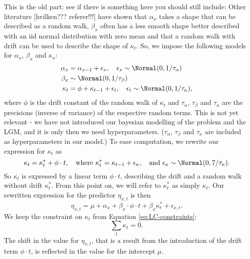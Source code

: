 \textcolor{myDarkGreen}{This is the old part: see if there is something here you should still include: }
Other literature [hvilken??? referer!!!] have shown that $\alpha_x$ takes a shape that can be described as a random walk, $\beta_x$ often has a less smooth shape better described with an iid normal distribution with zero mean and that a random walk with drift can be used to describe the shape of $\kappa_t$. So, we impose the following models for $\alpha_x$, $\beta_x$ and $\kappa_x$:
\begin{equation}
    \begin{aligned}
    \alpha_x &= \alpha_{x-1} + \epsilon_{x}, \quad \epsilon_x \sim \Normal(0,1/\tau_{\alpha}) \\
    \beta_x &\sim \Normal(0, 1/\tau_{\beta}) \\
    \kappa_t &= \phi + \kappa_{t-1} + \epsilon_t, \quad \epsilon_t\sim \Normal(0, 1/\tau_\kappa),
    \end{aligned}
    \label{eq:LCrandomEffects}
\end{equation}
where $\phi$ is the drift constant of the random walk of $\kappa_t$ and $\tau_\alpha$, $\tau_\beta$ and $\tau_\kappa$ are the precisions (inverse of variance) of the respective random terms.
\textcolor{myDarkGreen}{This is not yet relevant - we have not introduced our bayesian modelling of the problem and the LGM, and it is only then we need hyperparameters. }
($\tau_\alpha$, $\tau_\beta$ and $\tau_\kappa$ are included as hyperparameters in our model.)
To ease computation, we rewrite our expression for $\kappa_t$ as
\begin{equation}
    \kappa_t = \kappa_{t}^* + \phi\cdot t, \quad \text{where } \kappa_t^*=\kappa_{t-1} + \epsilon_\kappa, \quad\text{and }\epsilon_\kappa\sim\Normal(0, 7/\tau_\kappa).
    \label{eq:DriftlessKappa}
\end{equation}
So $\kappa_t$ is expressed by a linear term $\phi \cdot t$, describing the drift and a random walk without drift $\kappa_t^*$. From this point on, we will refer to $\kappa_t^*$ as simply $\kappa_t$. Our rewritten expression for the predictor $\eta_{x,t}$ is then
\begin{equation}
\eta_{x,t} = \mu + \alpha_x + \beta_x\cdot\phi\cdot t + \beta_x\kappa_t^* + \epsilon_{x,t}.
\end{equation}
We keep the constraint on $\kappa_t$ from Equation \ref{eq:LC-constraints}:
\begin{equation*}
    \sum_t \kappa_t = 0.
\end{equation*}
The shift in the value for $\eta_{x,t}$, that is a result from the introduction of the drift term $\phi \cdot t$, is reflected in the value for the intercept $\mu$. 
